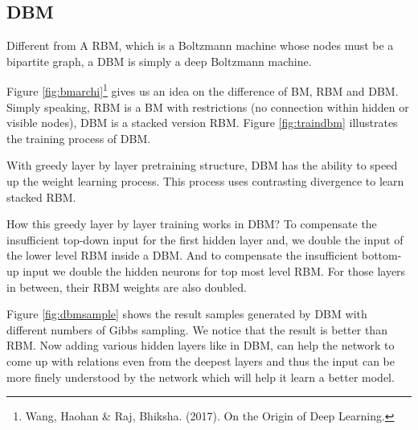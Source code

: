 \documentclass{article}
\begin{document}
\subsection{DBM}
Different from A RBM, which is a Boltzmann machine whose nodes must be a bipartite graph, a DBM is simply a deep Boltzmann machine.

Figure \ref{fig:bmarchi}\footnote{Wang, Haohan \& Raj, Bhiksha. (2017). On the Origin of Deep Learning.} gives us an idea on the difference of BM, RBM and DBM. Simply speaking, RBM is a BM with restrictions (no connection within hidden or visible nodes), DBM is a stacked version RBM. Figure \ref{fig:traindbm} illustrates the training process of DBM.

With greedy layer by layer pretraining structure, DBM has the ability to speed up the weight learning process. This process uses contrasting divergence to learn stacked RBM.

How this greedy layer by layer training works in DBM? To compensate the insufficient top-down input for the first hidden layer and, we double the input of the lower level RBM inside a DBM. And to compensate the insufficient bottom-up input we double the hidden neurons for top most level RBM. For those layers in between, their RBM weights are also doubled.

Figure \ref{fig:dbmsample} shows the result samples generated by DBM with different numbers of Gibbs sampling. We notice that the result is better than RBM. Now adding various hidden layers like in DBM, can help the network to come up with relations even from the deepest layers and thus the input can be more finely understood by the network which will help it learn a better model.
\end{document}
